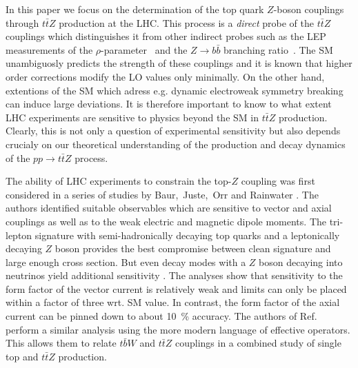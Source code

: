 \documentclass[preprint]{JHEP3} %
\def\ttbZ{t\bar{t}Z}
\begin{document}
In this paper we focus on the determination of the top quark $Z$-boson couplings through $\ttbZ$ production at the LHC. 
This process is a {\it direct} probe of the $\ttbZ$ couplings which distinguishes it from other indirect probes such as 
the LEP measurements of the $\rho$-parameter~\cite{} and the $Z \to b \bar{b}$ branching ratio~\cite{}. 
The SM unambiguosly predicts the strength of these couplings and it is known that higher order corrections modify the LO values only minimally.
On the other hand, extentions of the SM which adress e.g. dynamic electroweak symmetry breaking can induce large deviations. 
% 
% 
It is therefore important to know to what extent LHC experiments are sensitive to physics beyond the SM in $\ttbZ$ production.
Clearly, this is not only a question of experimental sensitivity but also depends crucialy on our theoretical understanding of the production and decay dynamics 
of the $pp\to\ttbZ$ process.

The ability of LHC experiments to constrain the top-$Z$ coupling was first considered in a series of studies by Baur,~Juste,~Orr and Rainwater \cite{Baur:2004uw,Baur:2005wi,one more Baur paper}. 
The authors identified suitable observables which are sensitive to vector and axial couplings as well as to the weak electric and magnetic dipole moments.
The tri-lepton signature with semi-hadronically decaying top quarks and a leptonically decaying $Z$ boson provides the best compromise between
clean signature and large enough cross section. 
But even decay modes with a $Z$ boson decaying into neutrinos yield additional sensitivity \cite{Baur:2005wi}.
The analyses show that sensitivity to the form factor of the vector current is relatively weak and limits can only be placed within a factor of three wrt. SM value. 
In contrast, the form factor of the axial current can be pinned down to about 10~\% accuracy. 
The authors of Ref.~\cite{Berger:2009hi} perform a similar analysis using the more modern language of effective operators.
This allows them to relate $t\bar{b}W$ and $\ttbZ$ couplings in a combined study of single top and $\ttbZ$ production.
\end{document}
